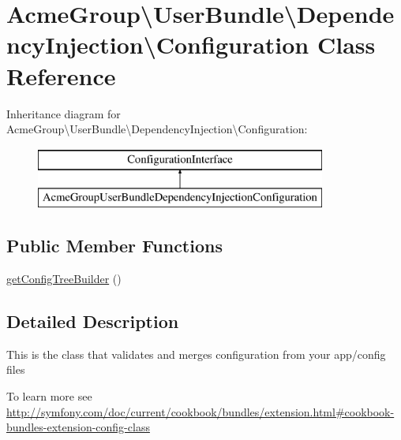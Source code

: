 \hypertarget{class_acme_group_1_1_user_bundle_1_1_dependency_injection_1_1_configuration}{\section{Acme\+Group\textbackslash{}User\+Bundle\textbackslash{}Dependency\+Injection\textbackslash{}Configuration Class Reference}
\label{class_acme_group_1_1_user_bundle_1_1_dependency_injection_1_1_configuration}
}
Inheritance diagram for Acme\+Group\textbackslash{}User\+Bundle\textbackslash{}Dependency\+Injection\textbackslash{}Configuration\+:\begin{figure}[H]
\begin{center}
\leavevmode
\includegraphics[height=2.000000cm]{class_acme_group_1_1_user_bundle_1_1_dependency_injection_1_1_configuration}
\end{center}
\end{figure}
\subsection*{Public Member Functions}
\begin{DoxyCompactItemize}
\item 
\hyperlink{class_acme_group_1_1_user_bundle_1_1_dependency_injection_1_1_configuration_a5263b238672d518bdcc967661f983c46}{get\+Config\+Tree\+Builder} ()
\end{DoxyCompactItemize}


\subsection{Detailed Description}
This is the class that validates and merges configuration from your app/config files

To learn more see \hyperlink{}{http\+://symfony.\+com/doc/current/cookbook/bundles/extension.\+html\#cookbook-\/bundles-\/extension-\/config-\/class} 

